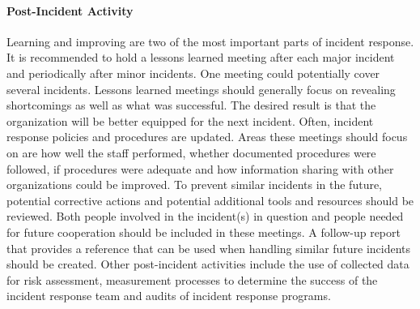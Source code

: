 \paragraph{Post-Incident Activity}
Learning and improving are two of the most important parts of incident response. It is recommended to hold a lessons learned meeting after each major incident and periodically after minor incidents. One meeting could potentially cover several incidents. Lessons learned meetings should generally focus on revealing shortcomings as well as what was successful. The desired result is that the organization will be better equipped for the next incident. Often, incident response policies and procedures are updated. Areas these meetings should focus on are how well the staff performed, whether documented procedures were followed, if procedures were adequate and how information sharing with other organizations could be improved. To prevent similar incidents in the future, potential corrective actions and potential additional tools and resources should be reviewed. Both people involved in the incident(s) in question and people needed for future cooperation should be included in these meetings. A follow-up report that provides a reference that can be used when handling similar future incidents should be created. Other post-incident activities include the use of collected data for risk assessment, measurement processes to determine the success of the incident response team and audits of incident response programs. 



